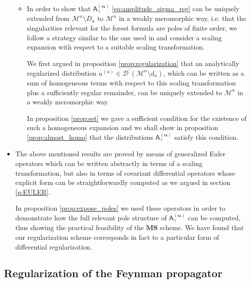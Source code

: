 \documentclass[11pt]{book}
\newcommand{\MS}{\textbf{MS}}
\newcommand{\alphabd}{\boldsymbol{\alpha}}
\newcommand{\Dcal}{\mathcal{D}}
\newcommand{\Mcal}{\mathcal{M}}
\newcommand{\Asf}{\mathsf{A}}
\theoremstyle{break}
\begin{document}
\begin{itemize}
\begin{itemize}
\item In order to show that $\Asf_\gamma^{(\alphabd)}$ \eqref{eq:amplitude_sigma_reg} can be uniquely extended from $\Mcal^n\setminus D_n$ to $\Mcal^n$ in a weakly meromorphic way, i.e. that the singularities relevant for the forest formula are poles of finite order, we follow a strategy similar to the one used in \cite{HW_2001} and consider a scaling expansion with respect to a suitable scaling transformation. 

We first argued in proposition \ref{prop:regularization} that an analytically regularized distribution $u^{(\alpha)}\in\Dcal^\prime(\Mcal^n\setminus d_n)$, which can be written as a sum of homogeneous terms with respect to this scaling transformation plus a sufficiently regular remainder, can be uniquely extended to $\Mcal^n$ in a weakly meromorphic way.

In proposition \ref{prop:set} we gave a sufficient condition for the existence of such a homogeneous expansion and we shall show in proposition \ref{prop:almost_homo} that the distributions $\Asf_\gamma^{(\alphabd)}$ satisfy this condition.

\end{itemize}


\item The above mentioned results are proved by means of generalized Euler operators which can be written abstractly in terms of a scaling transformation, but also in terms of covariant differential operators whose explicit form can be straightforwardly computed as we argued in section \ref{p:EULER}. 

In proposition \ref{prop:expose_poles} we used these operators in order to demonstrate how the full relevant pole structure of $\Asf_\gamma^{(\alphabd)}$ can be computed, thus showing the practical feasibility of the $\MS$ scheme. We have found that our regularization scheme corresponds in fact to a particular form of differential regularization.


\end{itemize}


\subsection{Regularization of the Feynman propagator}
\label{p:REG_FEYNMAN_PROP}
\end{document}
